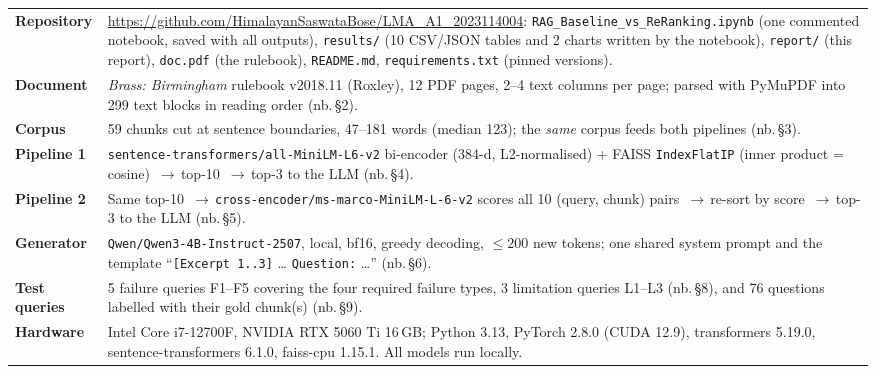 \documentclass[10pt,a4paper]{article}
\newcommand{\ra}{\,$\rightarrow$\,}
\newcommand{\nb}[1]{\textcolor{inktwo}{\small(nb.\,\S#1)}}   %
\begin{document}
\begin{table}[H]
\centering\footnotesize
\begin{tabularx}{\textwidth}{@{}>{\bfseries}p{2.25cm}X@{}}
\toprule
Repository & \url{https://github.com/HimalayanSaswataBose/LMA_A1_2023114004}: \texttt{RAG\_Baseline\_vs\_ReRanking.ipynb} (one commented notebook, saved with all outputs),
             \texttt{results/} (10 CSV/JSON tables and 2 charts written by the notebook),
             \texttt{report/} (this report), \texttt{doc.pdf} (the rulebook),
             \texttt{README.md}, \texttt{requirements.txt} (pinned versions). \\
Document   & \textit{Brass: Birmingham} rulebook v2018.11 (Roxley), 12 PDF pages, 2--4 text columns per page;
             parsed with PyMuPDF into 299 text blocks in reading order \nb{2}. \\
Corpus     & 59 chunks cut at sentence boundaries, 47--181 words (median 123); the \emph{same} corpus feeds both pipelines \nb{3}. \\
Pipeline 1 & \texttt{sentence-transformers/all-MiniLM-L6-v2} bi-encoder (384-d, L2-normalised) +
             FAISS \texttt{IndexFlatIP} (inner product = cosine) \ra top-10 \ra top-3 to the LLM \nb{4}. \\
Pipeline 2 & Same top-10 \ra \texttt{cross-encoder/ms-marco-MiniLM-L-6-v2} scores all 10 (query, chunk) pairs
             \ra re-sort by score \ra top-3 to the LLM \nb{5}. \\
Generator  & \texttt{Qwen/Qwen3-4B-Instruct-2507}, local, bf16, greedy decoding, ${\le}200$ new tokens;
             one shared system prompt and the template ``\texttt{[Excerpt 1..3]} \dots{} \texttt{Question:} \dots'' \nb{6}. \\
Test queries & 5 failure queries F1--F5 covering the four required failure types, 3 limitation queries L1--L3 \nb{8},
             and 76 questions labelled with their gold chunk(s) \nb{9}. \\
Hardware   & Intel Core i7-12700F, NVIDIA RTX 5060 Ti 16\,GB; Python 3.13, PyTorch 2.8.0 (CUDA 12.9),
             transformers 5.19.0, sentence-transformers 6.1.0, faiss-cpu 1.15.1. All models run locally. \\
\bottomrule
\end{tabularx}
\end{table}
\vspace{-6pt}
\end{document}
